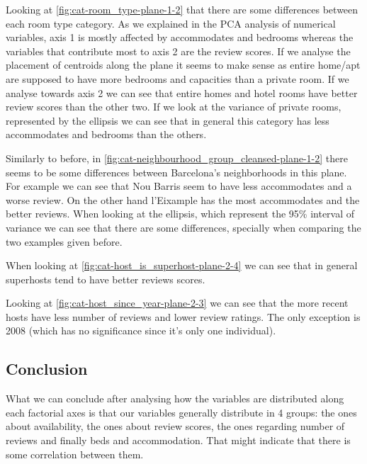 \begin{landscape}

Looking at \cref{fig:cat-room_type-plane-1-2} that there are some 
differences between each room type category. As we explained in the PCA analysis of numerical variables, axis 1 is mostly affected by accommodates and bedrooms whereas the variables that contribute most to axis 2 are the review scores. If we analyse the
placement of centroids along the plane it seems to make sense as entire home/apt are supposed to have more bedrooms and capacities than a private room. If we analyse towards axis 2 we can see that entire homes and hotel rooms have better review scores than the 
other two. If we look at the variance of private rooms, represented by the ellipsis we 
can see that in general this category has less accommodates and bedrooms than the others.



Similarly to before, in \cref{fig:cat-neighbourhood_group_cleansed-plane-1-2} there seems to be some differences between Barcelona's neighborhoods in this plane. For example we can 
see that Nou Barris seem to have less accommodates and a worse review. On the other
hand l'Eixample has the most accommodates and the better reviews. When looking at
the ellipsis, which represent the 95\% interval of variance we can see that there are
some differences, specially when comparing the two examples given before. 

When looking at \cref{fig:cat-host_is_superhost-plane-2-4} we can
see that in general superhosts tend to have better reviews scores.

Looking at \cref{fig:cat-host_since_year-plane-2-3} we can see that the more recent hosts have less number of
reviews and lower review ratings.
The only exception is 2008 (which has no significance since it's only one individual).

\end{landscape}

\subsection{Conclusion}%
What we can conclude after analysing how the variables are distributed along each factorial axes is 
that our variables generally distribute in 4 groups: the ones about availability,   
the ones about review scores, the ones regarding number of reviews and finally beds and accommodation. That might indicate that there is some correlation between them.

